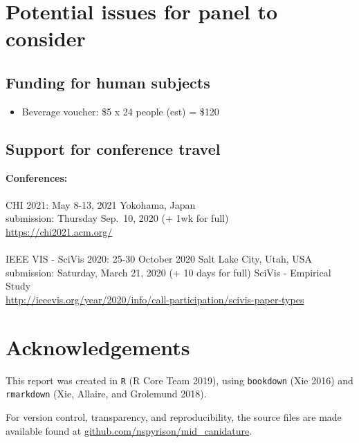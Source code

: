 \documentclass[11,]{article}
\providecommand{\tightlist}{%
  \setlength{\itemsep}{0pt}\setlength{\parskip}{0pt}}
\begin{document}
\hypertarget{potential-issues-for-panel-to-consider}{%
\section{Potential issues for panel to consider}\label{potential-issues-for-panel-to-consider}}

\hypertarget{funding-for-human-subjects}{%
\subsection{Funding for human subjects}\label{funding-for-human-subjects}}

\begin{itemize}
\tightlist
\item
  Beverage voucher: \$5 x 24 people (est) = \$120
\end{itemize}

\hypertarget{support-for-conference-travel}{%
\subsection{Support for conference travel}\label{support-for-conference-travel}}

\textbf{Conferences:}\\
~\\
CHI 2021: May 8-13, 2021 Yokohama, Japan\\
submission: Thursday Sep.~10, 2020 (+ 1wk for full)\\
\url{https://chi2021.acm.org/}~\\
~\\
IEEE VIS - SciVis 2020: 25-30 October 2020 Salt Lake City, Utah, USA\\
submission: Saturday, March 21, 2020 (+ 10 days for full) SciVis - Empirical Study\\
\url{http://ieeevis.org/year/2020/info/call-participation/scivis-paper-types}

\hypertarget{sec:acknowledgements}{%
\section{Acknowledgements}\label{sec:acknowledgements}}

This report was created in \texttt{R} (R Core Team 2019), using \texttt{bookdown} (Xie 2016) and \texttt{rmarkdown} (Xie, Allaire, and Grolemund 2018).

For version control, transparency, and reproducibility, the source files are made available found at \href{https://github.com/nspyrison/mid_canidature}{github.com/nspyrison/mid\_canidature}.
\end{document}
